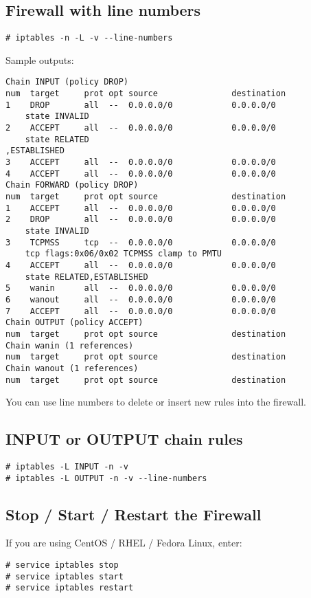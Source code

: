 \documentclass[dvipdfm]{book}
\begin{document}
\subsection{Firewall with line numbers}
\begin{verbatim}
# iptables -n -L -v --line-numbers
\end{verbatim}

Sample outputs:
\begin{verbatim}
Chain INPUT (policy DROP)
num  target     prot opt source               destination
1    DROP       all  --  0.0.0.0/0            0.0.0.0/0       
    state INVALID
2    ACCEPT     all  --  0.0.0.0/0            0.0.0.0/0       
    state RELATED
,ESTABLISHED
3    ACCEPT     all  --  0.0.0.0/0            0.0.0.0/0
4    ACCEPT     all  --  0.0.0.0/0            0.0.0.0/0
Chain FORWARD (policy DROP)
num  target     prot opt source               destination
1    ACCEPT     all  --  0.0.0.0/0            0.0.0.0/0
2    DROP       all  --  0.0.0.0/0            0.0.0.0/0       
    state INVALID
3    TCPMSS     tcp  --  0.0.0.0/0            0.0.0.0/0           
    tcp flags:0x06/0x02 TCPMSS clamp to PMTU
4    ACCEPT     all  --  0.0.0.0/0            0.0.0.0/0       
    state RELATED,ESTABLISHED
5    wanin      all  --  0.0.0.0/0            0.0.0.0/0
6    wanout     all  --  0.0.0.0/0            0.0.0.0/0
7    ACCEPT     all  --  0.0.0.0/0            0.0.0.0/0
Chain OUTPUT (policy ACCEPT)
num  target     prot opt source               destination
Chain wanin (1 references)
num  target     prot opt source               destination
Chain wanout (1 references)
num  target     prot opt source               destination
\end{verbatim}

You can use line numbers to delete or insert new rules into the firewall.

\subsection{INPUT or OUTPUT chain rules}
\begin{verbatim}
# iptables -L INPUT -n -v
# iptables -L OUTPUT -n -v --line-numbers
\end{verbatim}

\subsection{Stop / Start / Restart the Firewall}
If you are using CentOS / RHEL / Fedora Linux, enter:
\begin{verbatim}
# service iptables stop
# service iptables start
# service iptables restart
\end{verbatim}
\end{document}
